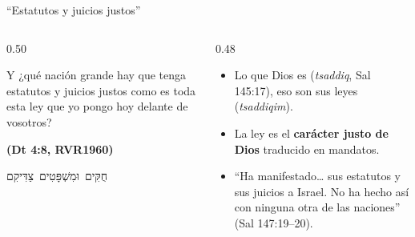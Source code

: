 \documentclass[hyperref={bookmarks=false},aspectratio=169]{beamer}
\newcommand{\heb}[1]{\mbox{\foreignlanguage{hebrew}{#1}}}
\newcommand{\fuente}[1]{\par\hfill{\upshape\bfseries\footnotesize\textcolor{azul}{#1}}}
\newcommand{\destacar}[1]{\textbf{\textcolor{azul}{#1}}}
\begin{document}
\begin{frame}{``Estatutos y juicios justos''}
\begin{columns}[c,onlytextwidth]
\begin{column}{0.50\textwidth}
\begin{cita}Y ¿qué nación grande hay que tenga estatutos y juicios justos como es toda esta ley que yo pongo hoy delante de vosotros?\fuente{(Dt 4:8, RVR1960)}\end{cita}
\begin{center}\small\heb{חֻקִּים וּמִשְׁפָּטִים צַדִּיקִם}\end{center}
\end{column}
\begin{column}{0.48\textwidth}\small
\begin{itemize}
\item Lo que Dios es (\emph{tsaddiq}, Sal 145:17), eso son sus leyes (\emph{tsaddiqim}).
\item La ley es el \destacar{carácter justo de Dios} traducido en mandatos.
\item ``Ha manifestado\ldots{} sus estatutos y sus juicios a Israel. No ha hecho así con ninguna otra de las naciones'' (Sal 147:19--20).
\end{itemize}
\end{column}
\end{columns}
\end{frame}
\end{document}
